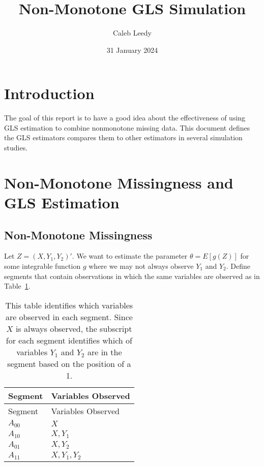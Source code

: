 \documentclass[
  letterpaper,
  DIV=11,
  numbers=noendperiod]{scrartcl}
\title{Non-Monotone GLS Simulation}
\author{Caleb Leedy}
\date{31 January 2024}
\begin{document}
\maketitle
\ifdefined\Shaded\renewenvironment{Shaded}{\begin{tcolorbox}[enhanced, interior hidden, borderline west={3pt}{0pt}{shadecolor}, frame hidden, boxrule=0pt, breakable, sharp corners]}{\end{tcolorbox}}\fi

\hypertarget{introduction}{%
\section{Introduction}\label{introduction}}

The goal of this report is to have a good idea about the effectiveness
of using GLS estimation to combine nonmonotone missing data. This
document defines the GLS estimators compares them to other estimators in
several simulation studies.

\hypertarget{non-monotone-missingness-and-gls-estimation}{%
\section{Non-Monotone Missingness and GLS
Estimation}\label{non-monotone-missingness-and-gls-estimation}}

\hypertarget{non-monotone-missingness}{%
\subsection{Non-Monotone Missingness}\label{non-monotone-missingness}}

Let \(Z = (X, Y_1, Y_2)'\). We want to estimate the parameter
\(\theta = E[g(Z)]\) for some integrable function \(g\) where we may not
always observe \(Y_1\) and \(Y_2\). Define segments that contain
observations in which the same variables are observed as in
Table~\ref{tbl-vars1}.

\hypertarget{tbl-vars1}{}
\begin{longtable}[]{@{}ll@{}}
\caption{\label{tbl-vars1}This table identifies which variables are
observed in each segment. Since \(X\) is always observed, the subscript
for each segment identifies which of variables \(Y_1\) and \(Y_2\) are
in the segment based on the position of a 1.}\tabularnewline
\toprule\noalign{}
Segment & Variables Observed \\
\midrule\noalign{}
\endfirsthead
\toprule\noalign{}
Segment & Variables Observed \\
\midrule\noalign{}
\endhead
\bottomrule\noalign{}
\endlastfoot
\(A_{00}\) & \(X\) \\
\(A_{10}\) & \(X, Y_1\) \\
\(A_{01}\) & \(X, Y_2\) \\
\(A_{11}\) & \(X, Y_1, Y_2\) \\
\end{longtable}
\end{document}
